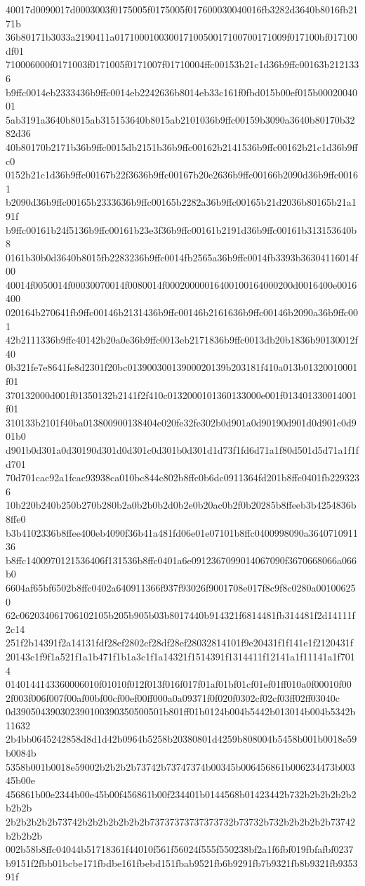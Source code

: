 40017d0090017d0003003f0175005f0175005f017600030040016fb3282d3640b8016fb2171b
36b80171b3033a2190411a01710001003001710050017100700171009f017100bf017100df01
710006000f0171003f0171005f0171007f01710004ffc00153b21c1d36b9ffc00163b2121336
b9ffc0014eb2333436b9ffc0014eb2242636b8014eb33c161f0fbd015b00ef015b0002004001
5ab3191a3640b8015ab315153640b8015ab2101036b9ffc00159b3090a3640b80170b3282d36
40b80170b2171b36b9ffc0015db2151b36b9ffc00162b2141536b9ffc00162b21c1d36b9ffc0
0152b21c1d36b9ffc00167b22f3636b9ffc00167b20e2636b9ffc00166b2090d36b9ffc00161
b2090d36b9ffc00165b2333636b9ffc00165b2282a36b9ffc00165b21d2036b80165b21a191f
b9ffc00161b24f5136b9ffc00161b23e3f36b9ffc00161b2191d36b9ffc00161b313153640b8
0161b30b0d3640b8015fb2283236b9ffc0014fb2565a36b9ffc0014fb3393b36304116014f00
40014f0050014f00030070014f0080014f00020000016400100164000200d0016400e0016400
020164b270641fb9ffc00146b2131436b9ffc00146b2161636b9ffc00146b2090a36b9ffc001
42b2111336b9ffc40142b20a0e36b9ffc0013eb2171836b9ffc0013db20b1836b90130012f40
0b321fe7e8641fe8d2301f20bc01390030013900020139b203181f410a013b01320010001f01
370132000d001f01350132b2141f2f410c0132000101360133000e001f013401330014001f01
310133b2101f40ba013800900138404e020fe32fe302b0d901a0d90190d901d0d901c0d901b0
d901b0d301a0d30190d301d0d301c0d301b0d301d1d73f1fd6d71a1f80d501d5d71a1f1fd701
70d701cac92a1fcac93938ca010bc844c802b8ffc0b6dc0911364fd201b8ffc0401fb2293236
10b220b240b250b270b280b2a0b2b0b2d0b2e0b20ac0b2f0b20285b8ffeeb3b4254836b8ffe0
b3b4102336b8ffee400eb4090f36b41a481fd06e01e07101b8ffc0400998090a364071091136
b8ffc1400970121536406f131536b8ffc0401a6e0912367099014067090f3670668066a066b0
6604af65bf6502b8ffc0402a640911366f937f93026f9001708e017f8c9f8c0280a001006250
62c062034061706102105b205b905b03b8017440b914321f6814481fb314481f2d14111f2c14
251f2b14391f2a14131fdf28ef2802cf28df28ef28032814101f9e20431f1f141e1f2120431f
20143c1f9f1a521f1a1b471f1b1a3c1f1a14321f1514391f1314411f12141a1f11141a1f7014
0140144143360006010f01010f012f013f016f017f01af01bf01cf01ef01ff010a0f00010f00
2f003f006f007f00af00bf00cf00ef00ff000a0a09371f0f020f0302cf02cf03ff02ff03040c
0d390504390302390100390350500501b801ff01b0124b004b5442b013014b004b5342b11632
2b4bb0645242858d8d1d42b0964b5258b20380801d4259b808004b5458b001b0018e59b0084b
5358b001b0018e59002b2b2b2b73742b73747374b00345b006456861b006234473b00345b00e
456861b00e2344b00e45b00f456861b00f234401b0144568b01423442b732b2b2b2b2b2b2b2b
2b2b2b2b2b73742b2b2b2b2b2b2b73737373737373732b73732b732b2b2b2b2b73742b2b2b2b
002b58b8ffc04044b51718361f44010f561f56024f555f550238bf2a1f6fbf019fbfafbf0237
b9151f2fbb01bcbe171fbdbe161fbebd151fbab9521fb6b9291fb7b9321fb8b9321fb935391f
